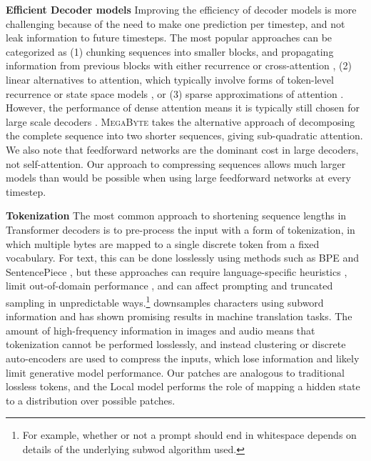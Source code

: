 \documentclass{article}
\newcommand{\fastslow}[0]{\textsc{MegaByte}\xspace}
\newcommand{\megabyte}[0]{\fastslow}
\theoremstyle{plain}
\theoremstyle{definition}
\theoremstyle{remark}
\begin{document}
\textbf{Efficient Decoder models} Improving the efficiency of decoder models is more challenging because of the need to make one prediction per timestep, and not leak information to future timesteps. The most popular approaches can be categorized as (1) chunking sequences into smaller blocks, and propagating information from previous blocks with either recurrence \citep{xfmxl,blockrecurrent} or cross-attention \citep{perceiverar}, (2) linear alternatives to attention, which typically involve forms of token-level recurrence \citep{lineartransformer, linear} or state space models \citep{s4,s5,mega}, or (3) sparse approximations of attention \citep{reformer,longformer,sparsetransformer,memorizing}. However, the performance of dense attention means it is typically still chosen for large scale decoders \citep{llama,palm}. \megabyte takes the alternative approach of decomposing the complete sequence into two shorter sequences, giving sub-quadratic attention. We also note that feedforward networks are the dominant cost in large decoders, not self-attention. Our approach to compressing sequences allows much larger models than would be possible when using large feedforward networks at every timestep.

\textbf{Tokenization} The most common approach to shortening sequence lengths in Transformer decoders is to pre-process the input with a form of tokenization, in which multiple bytes are mapped to a single discrete token from a fixed vocabulary. For text, this can be done losslessly using methods such as BPE \citep{bpe} and SentencePiece \citep{sentencepiece}, but these approaches can require language-specific heuristics \citep{gpt2}, limit out-of-domain performance \citep{sharami2023systematic}, and can affect prompting and truncated sampling in unpredictable ways.\footnote{For example, whether or not a prompt should end in whitespace depends on details of the underlying subwod algorithm used.} \citet{subword} downsamples characters using subword information and has shown promising results in machine translation tasks. The amount of high-frequency information in images and audio means that tokenization cannot be performed losslessly, and instead clustering \citep{hubert} or discrete auto-encoders \citep{dalle} are used to compress the inputs, which lose information and likely limit generative model performance. Our patches are analogous to traditional lossless tokens, and the Local model performs the role of mapping a hidden state to a distribution over possible patches.
\end{document}
